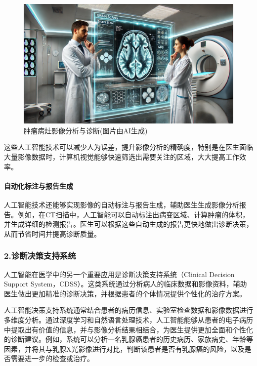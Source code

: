 \begin{figure}[ht]
  \centering
  \includegraphics[width=\linewidth]{image/4/医疗影像处理.png}
  \caption{肿瘤病灶影像分析与诊断(图片由AI生成)}
  \label{fig:医疗影像处理}
\end{figure}

这些人工智能技术可以减少人为误差，提升影像分析的精确度，特别是在医生面临大量影像数据时，计算机视觉能够快速筛选出需要关注的区域，大大提高工作效率。

\paragraph{自动化标注与报告生成}

人工智能技术还能够实现影像的自动标注与报告生成，辅助医生生成影像分析报告。例如，在CT扫描中，人工智能可以自动标注出病变区域、计算肿瘤的体积，并生成详细的检测报告。医生可以根据这些自动生成的报告更快地做出诊断决策，从而节省时间并提高诊断质量。

\subsubsection{2.诊断决策支持系统}

人工智能在医学中的另一个重要应用是诊断决策支持系统（Clinical Decision Support System，CDSS）。这类系统通过分析病人的临床数据和影像资料，辅助医生做出更加精准的诊断决策，并根据患者的个体情况提供个性化的治疗方案。

人工智能决策支持系统通常结合患者的病历信息、实验室检查数据和影像数据进行多维度分析。通过深度学习和自然语言处理技术，人工智能能够从患者的电子病历中提取出有价值的信息，并与影像分析结果相结合，为医生提供更加全面和个性化的诊断建议。例如，系统可以分析一名乳腺癌患者的历史病历、家族病史、年龄等因素，并将其与乳腺X光影像进行对比，判断该患者是否有乳腺癌的风险，以及是否需要进一步的检查或治疗。

